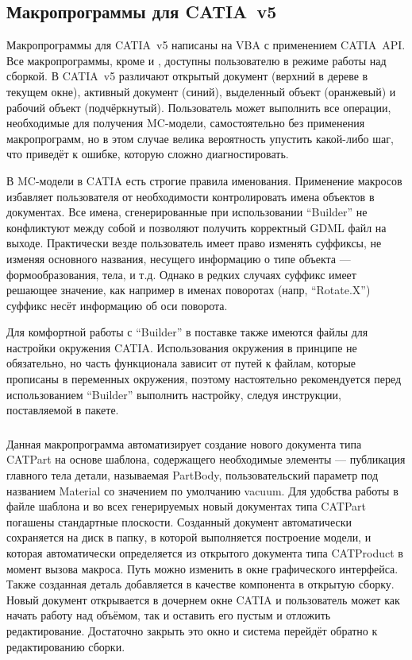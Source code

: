 \subsection{Макропрограммы для CATIA~v5}\label{sec:secMacros}

Макропрограммы для CATIA~v5 написаны на VBA с применением CATIA~API. Все макропрограммы, кроме  и , доступны пользователю в режиме работы над сборкой. В CATIA~v5 различают открытый документ (верхний в дереве в текущем окне), активный документ (синий), выделенный объект (оранжевый) и рабочий объект (подчёркнутый). Пользователь может выполнить все операции, необходимые для получения MC-модели, самостоятельно без применения макропрограмм, но в этом случае велика вероятность упустить какой-либо шаг, что приведёт к ошибке, которую сложно диагностировать.

В MC-модели в CATIA есть строгие правила именования. Применение макросов избавляет пользователя от необходимости контролировать имена объектов в документах. Все имена, сгенерированные при использовании ``Builder'' не конфликтуют между собой и позволяют получить корректный GDML файл на выходе. Практически везде пользователь имеет право изменять суффиксы, не изменяя основного названия, несущего информацию о типе объекта --- формообразования, тела, и т.д. Однако в редких случаях суффикс имеет решающее значение, как например в именах поворотах (напр, ``Rotate.X'') суффикс несёт информацию об оси поворота.


Для комфортной работы с ``Builder'' в поставке также имеются файлы для настройки окружения CATIA. Использования окружения в принципе не обязательно, но часть функционала зависит от путей к файлам, которые прописаны в переменных окружения, поэтому настоятельно рекомендуется перед использованием ``Builder'' выполнить настройку, следуя инструкции, поставляемой в пакете.

\subsubsection{}\label{sec:secMacroAddNewPart}

Данная макропрограмма автоматизирует создание нового документа типа CATPart на основе шаблона, содержащего необходимые элементы --- публикация главного тела детали, называемая PartBody, пользовательский параметр под названием Material со значением по умолчанию vacuum. Для удобства работы в файле шаблона и во всех генерируемых новый документах типа CATPart погашены стандартные плоскости. Созданный документ автоматически сохраняется на диск в папку, в которой выполняется построение модели, и которая автоматически определяется из открытого документа типа CATProduct в момент вызова макроса. Путь можно изменить в окне графического интерфейса. Также созданная деталь добавляется в качестве компонента в открытую сборку. Новый документ открывается в дочернем окне CATIA и пользователь может как начать работу над объёмом, так и оставить его пустым и отложить редактирование. Достаточно закрыть это окно и система перейдёт обратно к редактированию сборки.

